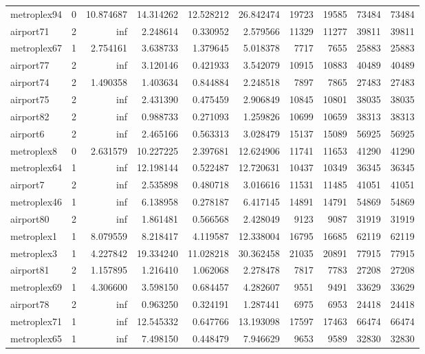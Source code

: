 \begin{longtable}{|l|r|r|r|r|r|r|r|r|r|}
metroplex94 & 0 & 10.874687 & 14.314262 & 12.528212 & 26.842474 & 19723 & 19585 & 73484 & 73484 \\
airport71 & 2 & inf & 2.248614 & 0.330952 & 2.579566 & 11329 & 11277 & 39811 & 39811 \\
metroplex67 & 1 & 2.754161 & 3.638733 & 1.379645 & 5.018378 & 7717 & 7655 & 25883 & 25883 \\
airport77 & 2 & inf & 3.120146 & 0.421933 & 3.542079 & 10915 & 10883 & 40489 & 40489 \\
airport74 & 2 & 1.490358 & 1.403634 & 0.844884 & 2.248518 & 7897 & 7865 & 27483 & 27483 \\
airport75 & 2 & inf & 2.431390 & 0.475459 & 2.906849 & 10845 & 10801 & 38035 & 38035 \\
airport82 & 2 & inf & 0.988733 & 0.271093 & 1.259826 & 10699 & 10659 & 38313 & 38313 \\
airport6 & 2 & inf & 2.465166 & 0.563313 & 3.028479 & 15137 & 15089 & 56925 & 56925 \\
metroplex8 & 0 & 2.631579 & 10.227225 & 2.397681 & 12.624906 & 11741 & 11653 & 41290 & 41290 \\
metroplex64 & 1 & inf & 12.198144 & 0.522487 & 12.720631 & 10437 & 10349 & 36345 & 36345 \\
airport7 & 2 & inf & 2.535898 & 0.480718 & 3.016616 & 11531 & 11485 & 41051 & 41051 \\
metroplex46 & 1 & inf & 6.138958 & 0.278187 & 6.417145 & 14891 & 14791 & 54869 & 54869 \\
airport80 & 2 & inf & 1.861481 & 0.566568 & 2.428049 & 9123 & 9087 & 31919 & 31919 \\
metroplex1 & 1 & 8.079559 & 8.218417 & 4.119587 & 12.338004 & 16795 & 16685 & 62119 & 62119 \\
metroplex3 & 1 & 4.227842 & 19.334240 & 11.028218 & 30.362458 & 21035 & 20891 & 77915 & 77915 \\
airport81 & 2 & 1.157895 & 1.216410 & 1.062068 & 2.278478 & 7817 & 7783 & 27208 & 27208 \\
metroplex69 & 1 & 4.306600 & 3.598150 & 0.684457 & 4.282607 & 9551 & 9491 & 33629 & 33629 \\
airport78 & 2 & inf & 0.963250 & 0.324191 & 1.287441 & 6975 & 6953 & 24418 & 24418 \\
metroplex71 & 1 & inf & 12.545332 & 0.647766 & 13.193098 & 17597 & 17463 & 66474 & 66474 \\
metroplex65 & 1 & inf & 7.498150 & 0.448479 & 7.946629 & 9653 & 9589 & 32830 & 32830 \\

\end{longtable}
